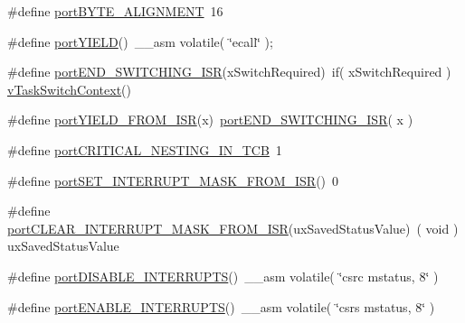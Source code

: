 \begin{DoxyCompactItemize}
\item 
\#define \hyperlink{externals_2freertos_2portable_2_g_c_c_2_r_i_s_c-_v_2portmacro_8h_ab9091ce3940d8bd93ec850122a2c6a1c}{port\+B\+Y\+T\+E\+\_\+\+A\+L\+I\+G\+N\+M\+E\+NT}~16
\item 
\#define \hyperlink{externals_2freertos_2portable_2_g_c_c_2_r_i_s_c-_v_2portmacro_8h_ae1ff06193615f5130b5a97dc9e708fc7}{port\+Y\+I\+E\+LD}()~\+\_\+\+\_\+asm volatile( \char`\"{}ecall\char`\"{} );
\item 
\#define \hyperlink{externals_2freertos_2portable_2_g_c_c_2_r_i_s_c-_v_2portmacro_8h_a63b994040c62c9685490a71c87a13d8a}{port\+E\+N\+D\+\_\+\+S\+W\+I\+T\+C\+H\+I\+N\+G\+\_\+\+I\+SR}(x\+Switch\+Required)~if( x\+Switch\+Required ) \hyperlink{vendor_2ceedling_2plugins_2freertos_2vendor_2freertos_2tasks_8c_a9c86137bc3c1cbffc39fff22627cb885}{v\+Task\+Switch\+Context}()
\item 
\#define \hyperlink{externals_2freertos_2portable_2_g_c_c_2_r_i_s_c-_v_2portmacro_8h_aac6850c66595efdc02a8bbb95fb4648e}{port\+Y\+I\+E\+L\+D\+\_\+\+F\+R\+O\+M\+\_\+\+I\+SR}(x)~\hyperlink{vendor_2ceedling_2plugins_2freertos_2vendor_2freertos_2portable_2_g_c_c_2_p_o_s_i_x_2portmacro_8h_a63b994040c62c9685490a71c87a13d8a}{port\+E\+N\+D\+\_\+\+S\+W\+I\+T\+C\+H\+I\+N\+G\+\_\+\+I\+SR}( x )
\item 
\#define \hyperlink{externals_2freertos_2portable_2_g_c_c_2_r_i_s_c-_v_2portmacro_8h_a4088d4f41bae06c9e871b918888ce7e6}{port\+C\+R\+I\+T\+I\+C\+A\+L\+\_\+\+N\+E\+S\+T\+I\+N\+G\+\_\+\+I\+N\+\_\+\+T\+CB}~1
\item 
\#define \hyperlink{externals_2freertos_2portable_2_g_c_c_2_r_i_s_c-_v_2portmacro_8h_a31b4260dbc1823ba80b578f86eb15a98}{port\+S\+E\+T\+\_\+\+I\+N\+T\+E\+R\+R\+U\+P\+T\+\_\+\+M\+A\+S\+K\+\_\+\+F\+R\+O\+M\+\_\+\+I\+SR}()~0
\item 
\#define \hyperlink{externals_2freertos_2portable_2_g_c_c_2_r_i_s_c-_v_2portmacro_8h_a2661e2c5a4e4afe5bef2ebe9872e28b3}{port\+C\+L\+E\+A\+R\+\_\+\+I\+N\+T\+E\+R\+R\+U\+P\+T\+\_\+\+M\+A\+S\+K\+\_\+\+F\+R\+O\+M\+\_\+\+I\+SR}(ux\+Saved\+Status\+Value)~( void ) ux\+Saved\+Status\+Value
\item 
\#define \hyperlink{externals_2freertos_2portable_2_g_c_c_2_r_i_s_c-_v_2portmacro_8h_a6e3d10ee1a0734a647ca192523c2cfc1}{port\+D\+I\+S\+A\+B\+L\+E\+\_\+\+I\+N\+T\+E\+R\+R\+U\+P\+TS}()~\+\_\+\+\_\+asm volatile( \char`\"{}csrc mstatus, 8\char`\"{} )
\item 
\#define \hyperlink{externals_2freertos_2portable_2_g_c_c_2_r_i_s_c-_v_2portmacro_8h_abc47e85a6befbb47961ad5ee7aa57173}{port\+E\+N\+A\+B\+L\+E\+\_\+\+I\+N\+T\+E\+R\+R\+U\+P\+TS}()~\+\_\+\+\_\+asm volatile( \char`\"{}csrs mstatus, 8\char`\"{} )

\end{DoxyCompactItemize}
